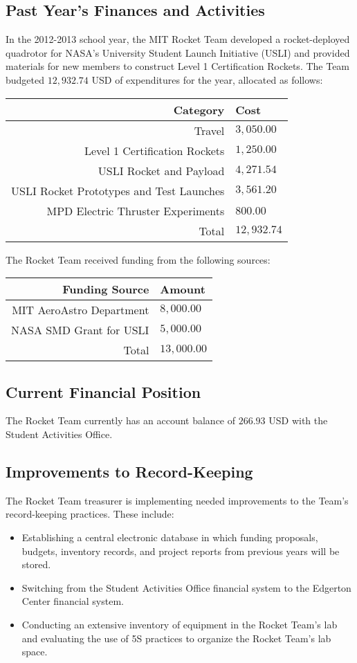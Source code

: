 \documentclass{article}
\begin{document}
\subsection*{Past Year's Finances and Activities}
In the 2012-2013 school year, the MIT Rocket Team developed a rocket-deployed quadrotor for NASA's University Student Launch Initiative (USLI) and provided materials for new members to construct Level 1 Certification Rockets. The Team budgeted $12,932.74$ USD of expenditures for the year, allocated as follows:\\
\begin{tabular}{r | l}
Category & Cost \\
\hline
Travel & $3,050.00$\\
Level 1 Certification Rockets & $1,250.00$\\
USLI Rocket and Payload & $4,271.54$\\
USLI Rocket Prototypes and Test Launches & $3,561.20$\\
MPD Electric Thruster Experiments & $800.00$\\
\hline
Total & $12,932.74$\\
\end{tabular}

The Rocket Team received funding from the following sources:\\
\begin{tabular}{r | l}
Funding Source & Amount \\
\hline
MIT AeroAstro Department & $8,000.00$\\
NASA SMD Grant for USLI & $5,000.00$\\
\hline
Total & $13,000.00$\\
\end{tabular}
\subsection*{Current Financial Position}
The Rocket Team currently has an account balance of $266.93$ USD with the Student Activities Office.
\subsection*{Improvements to Record-Keeping}
The Rocket Team treasurer is implementing needed improvements to the Team's record-keeping practices. These include:\\
\begin{itemize}
\item Establishing a central electronic database in which funding proposals, budgets, inventory records, and project reports from previous years will be stored.
\item Switching from the Student Activities Office financial system to the Edgerton Center financial system.
\item Conducting an extensive inventory of equipment in the Rocket Team's lab and evaluating the use of 5S practices to organize the Rocket Team's lab space.
\end{itemize}
\end{document}
